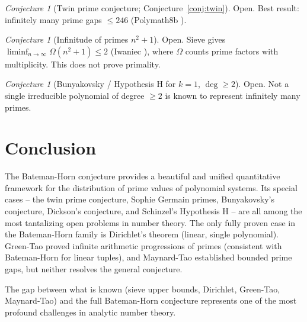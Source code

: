 \documentclass[12pt,a4paper]{amsart}
\theoremstyle{definition}
\theoremstyle{remark}
\newtheorem{conjecture}[theorem]{Conjecture}
\begin{document}
\begin{conjecture}[Twin prime conjecture; Conjecture~\ref{conj:twin}]
  Open. Best result: infinitely many prime gaps $\leq 246$ (Polymath8b \cite{Polymath2014}).
\end{conjecture}

\begin{conjecture}[Infinitude of primes $n^2+1$]
  Open. Sieve gives $\liminf_{n\to\infty} \Omega(n^2+1) \leq 2$ (Iwaniec \cite{Iwaniec1978}),
  where $\Omega$ counts prime factors with multiplicity. This does not prove primality.
\end{conjecture}

\begin{conjecture}[Bunyakovsky / Hypothesis H for $k=1$, $\deg \geq 2$]
  Open. Not a single irreducible polynomial of degree $\geq 2$ is known to represent
  infinitely many primes.
\end{conjecture}

\section{Conclusion}\label{sec:conclusion}

The Bateman-Horn conjecture provides a beautiful and unified quantitative framework for
the distribution of prime values of polynomial systems. Its special cases -- the twin
prime conjecture, Sophie Germain primes, Bunyakovsky's conjecture, Dickson's conjecture,
and Schinzel's Hypothesis H -- are all among the most tantalizing open problems in
number theory. The only fully proven case in the Bateman-Horn family is Dirichlet's
theorem (linear, single polynomial). Green-Tao proved infinite arithmetic progressions
of primes (consistent with Bateman-Horn for linear tuples), and Maynard-Tao established
bounded prime gaps, but neither resolves the general conjecture.

The gap between what is known (sieve upper bounds, Dirichlet, Green-Tao, Maynard-Tao)
and the full Bateman-Horn conjecture represents one of the most profound challenges
in analytic number theory.
\end{document}
